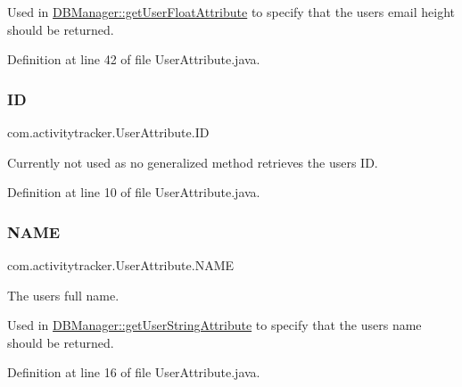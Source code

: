Used in \mbox{\hyperlink{classcom_1_1activitytracker_1_1_d_b_manager_a98df66254bec4d74b29cfe468a9fc794}{D\+B\+Manager\+::get\+User\+Float\+Attribute}} to specify that the user\textquotesingle{}s email height should be returned. 

Definition at line 42 of file User\+Attribute.\+java.

\mbox{\label{enumcom_1_1activitytracker_1_1_user_attribute_a82c5680d15b629e939afcd98a39abf76}} 
\subsubsection{\texorpdfstring{ID}{ID}}
{\footnotesize\ttfamily com.\+activitytracker.\+User\+Attribute.\+ID}

Currently not used as no generalized method retrieves the user\textquotesingle{}s ID. 

Definition at line 10 of file User\+Attribute.\+java.

\mbox{\label{enumcom_1_1activitytracker_1_1_user_attribute_aac51a5dfcaaa9e5304d37d74fc888af4}} 
\subsubsection{\texorpdfstring{NAME}{NAME}}
{\footnotesize\ttfamily com.\+activitytracker.\+User\+Attribute.\+N\+A\+ME}

The user\textquotesingle{}s full name.

Used in \mbox{\hyperlink{classcom_1_1activitytracker_1_1_d_b_manager_a20f726c054d6c8a6fc3ce629d87f1114}{D\+B\+Manager\+::get\+User\+String\+Attribute}} to specify that the user\textquotesingle{}s name should be returned. 

Definition at line 16 of file User\+Attribute.\+java.

\mbox{\label{enumcom_1_1activitytracker_1_1_user_attribute_aa893eac0362a28e73a599ce1ba141d40}} 
